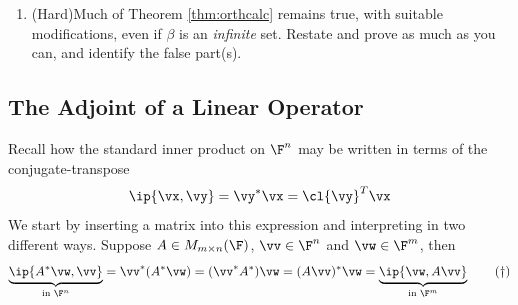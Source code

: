 \begin{exercises}{}{}
\begin{enumerate}
  
  \item (Hard)\quad Much of Theorem \ref{thm:orthcalc} remains true, with suitable modifications, even if $\beta$ is an \emph{infinite} set. Restate and prove as much as you can, and identify the false part(s).%

  
	
\end{enumerate}
\end{exercises}

\clearpage


\subsection{The Adjoint of a Linear Operator}

Recall how the standard inner product on $\F^n$ may be written in terms of the conjugate-transpose%
\[\ip{\vx,\vy}=\vy^*\vx =\cl{\vy}^T\vx\]
We start by inserting a matrix into this expression and interpreting in two different ways. Suppose $A\in M_{m\times n}(\F)$, $\vv\in\F^n$ and $\vw\in\F^m$, then
\[\underbrace{\ip{A^*\vw,\vv}}_{\text{in }\F^n}=\vv^*(A^*\vw)= (\vv^*A^*)\vw =(A\vv)^*\vw=\underbrace{\ip{\vw,A\vv}}_{\text{in }\F^m} \tag{$\dag$}\]

